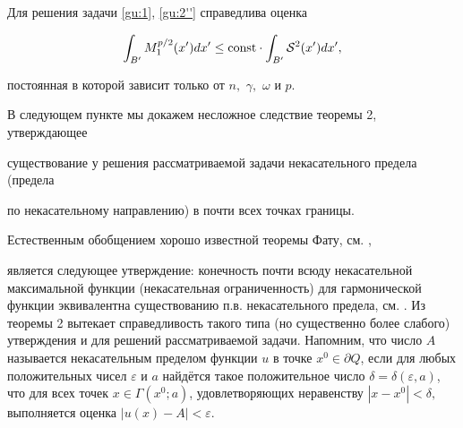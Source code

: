 \smallskip



\begin{theorem}Для решения задачи \eqref{gu:1}{\rm ,} \eqref{gu:2''} справедлива оценка

$$

\int_{B'} M_1^{p/2}(x') dx' \leq {\mathop{\rm const}\nolimits } \cdot \int_{B'} {\cal S}^2(x') dx',

$$

постоянная в которой зависит только от $n,$ $\gamma,$ $\omega$ и $p.$

\end{theorem}



\smallskip



В следующем пункте мы докажем несложное следствие теоремы 2, утверждающее

существование у решения рассматриваемой задачи некасательного предела (предела

по некасательному направлению) в почти всех точках границы.




\smallskip




Естественным обобщением хорошо известной теоремы Фату, см. \cite{Fatou},

является следующее утверждение: конечность почти всюду некасательной максимальной функции (некасательная ограниченность) для гармонической функции эквивалентна существованию п.в. некасательного предела, см. \cite{Stein,Priv,SteinIn}. Из теоремы 2 вытекает справедливость такого типа (но существенно более слабого) утверждения и для решений рассматриваемой задачи. Напомним, что число $A$ называется некасательным пределом функции $u$ в точке $x^0 \in \partial Q$, если для любых  положительных чисел $\varepsilon$ и $a$ найдётся такое положительное число $\delta = \delta (\varepsilon , a)$, что для всех точек $x \in \Gamma(x^0;

a)$, удовлетворяющих неравенству $|x - x^0| < \delta,$ выполняется оценка $|u(x) - A| < \varepsilon$.



\smallskip




